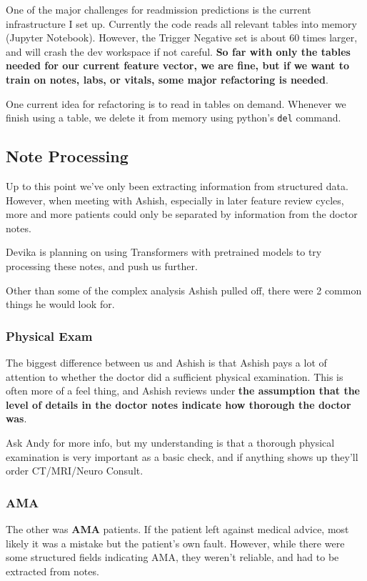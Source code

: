 \documentclass[12pt]{article}
\theoremstyle{definition}
\begin{document}
One of the major challenges for readmission predictions is the current infrastructure I set up. Currently the code reads all relevant tables into memory (Jupyter Notebook). However, the Trigger Negative set is about 60 times larger, and will crash the dev workspace if not careful. \textbf{So far with only the tables needed for our current feature vector, we are fine, but if we want to train on notes, labs, or vitals, some major refactoring is needed}.

One current idea for refactoring is to read in tables on demand. Whenever we finish using a table, we delete it from memory using python's \texttt{del} command.

\subsection{Note Processing}
Up to this point we've only been extracting information from structured data. However, when meeting with Ashish, especially in later feature review cycles, more and more patients could only be separated by information from the doctor notes.

Devika is planning on using Transformers with pretrained models to try processing these notes, and push us further.

Other than some of the complex analysis Ashish pulled off, there were 2 common things he would look for.

\subsubsection{Physical Exam}
The biggest difference between us and Ashish is that Ashish pays a lot of attention to whether the doctor did a sufficient physical examination. This is often more of a feel thing, and Ashish reviews under \textbf{the assumption that the level of details in the doctor notes indicate how thorough the doctor was}.

Ask Andy for more info, but my understanding is that a thorough physical examination is very important as a basic check, and if anything shows up they'll order CT/MRI/Neuro Consult.

\subsubsection{AMA}
The other was \textbf{AMA} patients. If the patient left against medical advice, most likely it was a mistake but the patient's own fault. However, while there were some structured fields indicating AMA, they weren't reliable, and had to be extracted from notes.
\end{document}
